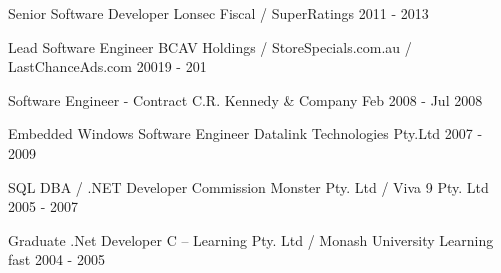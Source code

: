 \begin{cventries}
  \cventry
  {Senior Software Developer} %
  {Lonsec Fiscal / SuperRatings} %
  {} %
  {2011 - 2013} %
  {}  %

  \cventry
  {Lead Software Engineer } %
  {BCAV Holdings /  StoreSpecials.com.au /  LastChanceAds.com} %
  {} %
  {20019 - 201} %
  {}  %

  \cventry
  {Software Engineer - Contract} %
  {C.R. Kennedy \& Company} %
  {} %
  {Feb 2008 - Jul 2008} %
  {}  %

  \cventry
  {Embedded Windows Software Engineer} %
  {Datalink Technologies Pty.Ltd} %
  {} %
  {2007 - 2009} %
  {}  %

  \cventry
  {SQL DBA / .NET Developer} %
  {Commission Monster Pty. Ltd / Viva 9 Pty. Ltd} %
  {} %
  {2005 - 2007} %
  {}  %

  \cventry
  {Graduate .Net Developer} %
  {C – Learning  Pty. Ltd / Monash University Learning fast} %
  {} %
  {2004 - 2005} %
  {}  %

\end{cventries}